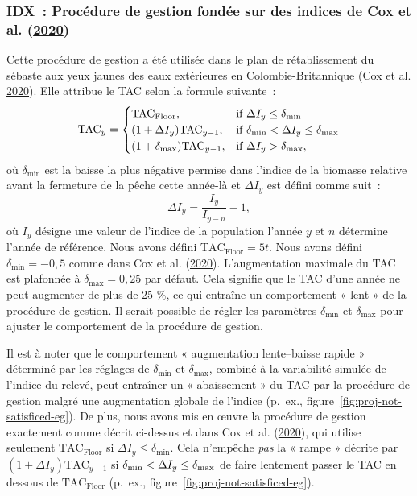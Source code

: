 \documentclass[french,11pt]{book}
\newcommand{\lt}{\ensuremath <}
\newcommand{\gt}{\ensuremath >}
\begin{document}
\hypertarget{sec:mp-idx}{%
\subsubsection{\texorpdfstring{IDX~: Procédure de gestion fondée sur des indices de Cox et al. (\protect\hyperlink{ref-cox2020}{2020})}{IDX~: Procédure de gestion fondée sur des indices de Cox et al. (2020)}}\label{sec:mp-idx}}

Cette procédure de gestion a été utilisée dans le plan de rétablissement du sébaste aux yeux jaunes des eaux extérieures en Colombie-Britannique (Cox et al. \protect\hyperlink{ref-cox2020}{2020}). Elle attribue le TAC selon la formule suivante~:
\begin{equation}
\textrm{TAC}_y =
\begin{cases}
\textrm{TAC}_\textrm{Floor}, & \textrm{if}\ \Delta I_y \leq \delta_\textrm{min} \\
(1 + \Delta I_y ) \textrm{TAC}_{y-1}, & \textrm{if}\ \delta_\textrm{min} \lt \Delta I_y \leq \delta_\textrm{max} \\
(1 + \delta_\textrm{max}) \textrm{TAC}_{y-1}, & \textrm{if}\ \Delta I_y \gt \delta_\textrm{max},
\end{cases}
\end{equation}
où \(\delta_\textrm{min}\) est la baisse la plus négative permise dans l'indice de la biomasse relative avant la fermeture de la pêche cette année-là et \(\Delta I_y\) est défini comme suit~:
\begin{equation}
\Delta I_y = \frac{I_y}{I_{y-n}} - 1,
\end{equation}
où \(I_y\) désigne une valeur de l'indice de la population l'année \(y\) et \(n\) détermine l'année de référence. Nous avons défini \(\textrm{TAC}_\textrm{Floor} = 5 t\). Nous avons défini \(\delta_\textrm{min} = -0,5\) comme dans Cox et al. (\protect\hyperlink{ref-cox2020}{2020}). L'augmentation maximale du TAC est plafonnée à \(\delta_\textrm{max} = 0,25\) par défaut. Cela signifie que le TAC d'une année ne peut augmenter de plus de 25 \%, ce qui entraîne un comportement « lent » de la procédure de gestion. Il serait possible de régler les paramètres \(\delta_\textrm{min}\) et \(\delta_\textrm{max}\) pour ajuster le comportement de la procédure de gestion.

Il est à noter que le comportement « augmentation lente--baisse rapide » déterminé par les réglages de \(\delta_\textrm{min}\) et \(\delta_\textrm{max}\), combiné à la variabilité simulée de l'indice du relevé, peut entraîner un « abaissement » du TAC par la procédure de gestion malgré une augmentation globale de l'indice (p.~ex., figure~\ref{fig:proj-not-satisficed-eg}). De plus, nous avons mis en œuvre la procédure de gestion exactement comme décrit ci-dessus et dans Cox et al. (\protect\hyperlink{ref-cox2020}{2020}), qui utilise seulement \(\textrm{TAC}_\textrm{Floor}\) si \(\Delta I_y \leq \delta_\textrm{min}\). Cela n'empêche \emph{pas} la « rampe » décrite par \((1 + \Delta I_y ) \textrm{TAC}_{y-1}\) si \(\delta_\textrm{min} \lt \Delta I_y \leq \delta_\textrm{max}\) de faire lentement passer le TAC en dessous de \(\textrm{TAC}_\textrm{Floor}\) (p.~ex., figure~\ref{fig:proj-not-satisficed-eg}).
\end{document}

